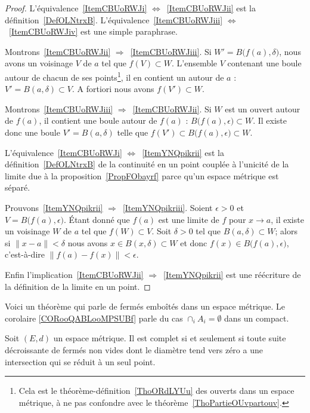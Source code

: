 \begin{proof}
	L'équivalence~\ref{ItemCBUoRWJi} \( \Leftrightarrow\)~\ref{ItemCBUoRWJii} est la définition~\ref{DefOLNtrxB}. L'équivalence~\ref{ItemCBUoRWJiii} \( \Leftrightarrow\)~\ref{ItemCBUoRWJiv} est une simple paraphrase.

	Montrons~\ref{ItemCBUoRWJii} \( \Rightarrow\)~\ref{ItemCBUoRWJiii}. Si \( W'=B\big( f(a),\delta \big)\), nous avons un voisinage \( V\) de \( a\) tel que \( f(V)\subset W\). L'ensemble \( V\) contenant une boule autour de chacun de ses points\footnote{Cela est le théorème-définition~\ref{ThoORdLYUu} des ouverts dans un espace métrique, à ne pas confondre avec le théorème~\ref{ThoPartieOUvpartouv}.}, il en contient un autour de \( a\) : \( V'=B(a,\delta)\subset V\). A fortiori nous avons \( f(V')\subset W\).

	Montrons~\ref{ItemCBUoRWJiii} \( \Rightarrow\)~\ref{ItemCBUoRWJii}. Si \( W\) est un ouvert autour de \( f(a)\), il contient une boule autour de \( f(a)\) : \( B\big( f(a),\epsilon \big)\subset W\). Il existe donc une boule \( V'=B(a,\delta)\) telle que \( f(V')\subset B\big( f(a),\epsilon \big)\subset W\).

	L'équivalence~\ref{ItemCBUoRWJi} \( \Leftrightarrow\)~\ref{ItemYNQpikrii} est la définition~\ref{DefOLNtrxB} de la continuité en un point couplée à l'unicité de la limite due à la proposition~\ref{PropFObayrf} parce qu'un espace métrique est séparé.

	Prouvons~\ref{ItemYNQpikrii} \( \Rightarrow\)~\ref{ItemYNQpikriii}. Soient \( \epsilon>0\) et \( V=B\big( f(a),\epsilon \big)\). Étant donné que \( f(a)\) est une limite de \( f\) pour \( x\to a\), il existe un voisinage \( W\) de \( a\) tel que \( f(W)\subset V\). Soit \( \delta>0\) tel que \( B(a,\delta)\subset W\); alors si \( \| x-a \|<\delta\) nous avons \( x\in B(x,\delta)\subset W\) et donc \( f(x)\in B\big( f(a),\epsilon \big)\), c'est-à-dire \( \| f(a)-f(x) \|<\epsilon\).

	Enfin l'implication~\ref{ItemCBUoRWJii} \( \Rightarrow\)~\ref{ItemYNQpikrii} est une réécriture de la définition de la limite en un point.
\end{proof}

Voici un théorème qui parle de fermés emboîtés dans un espace métrique. Le corolaire \ref{CORooQABLooMPSUBf} parle du cas \( \cap_iA_i=\emptyset\) dans un compact.
\begin{theorem}   \label{ThoCQAcZxX}
	Soit \( (E,d)\) un espace métrique. Il est complet si et seulement si toute suite décroissante de fermés non vides dont le diamètre tend vers zéro a une intersection qui se réduit à un seul point.
\end{theorem}

